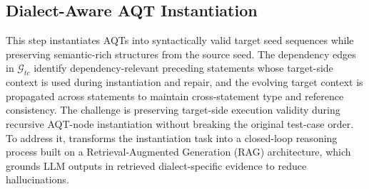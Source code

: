 \documentclass[conference]{IEEEtran}
\begin{document}
\subsection{Dialect-Aware AQT Instantiation}
\label{sec:translation}
This step instantiates AQTs into syntactically valid target seed sequences while preserving semantic-rich structures from the source seed.
The dependency edges in $\mathcal{G}_{tc}$ identify dependency-relevant preceding statements whose target-side context is used during instantiation and repair, and the evolving target context is propagated across statements to maintain cross-statement type and reference consistency.
The challenge is preserving target-side execution validity during recursive AQT-node instantiation without breaking the original test-case order.
To address it, \tool{} transforms the instantiation task into a closed-loop reasoning process built on a Retrieval-Augmented Generation (RAG) architecture, which grounds LLM outputs in retrieved dialect-specific evidence to reduce hallucinations.
\end{document}
